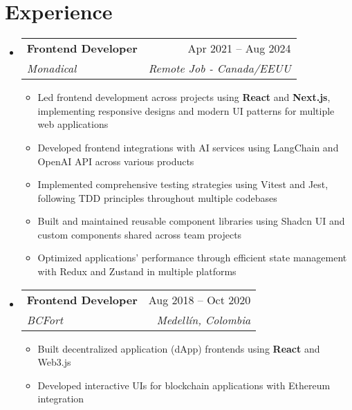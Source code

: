 \documentclass[letterpaper,11pt]{article}
\makeatletter
\newcommand{\resumeSubheading}[4]{
  \vspace{-2pt}
  \item[]
  \begin{tabular*}{\textwidth}{@{\extracolsep{\fill}}l r}
    \textbf{#1} & #2 \\
    \textit{#3} & \textit{#4} \\
  \end{tabular*}
  \vspace{-5pt}
}
\makeatother
\begin{document}
\section{Experience}
\begin{itemize}[leftmargin=0pt, itemindent=0pt, label={}]
\resumeSubheading
{Frontend Developer}{Apr 2021 -- Aug 2024}
{Monadical}{Remote Job - Canada/EEUU}
\begin{itemize}[leftmargin=*]
\item Led frontend development across projects using \textbf{React} and \textbf{Next.js}, implementing responsive designs and modern UI patterns for multiple web applications
\item Developed frontend integrations with AI services using LangChain and OpenAI API across various products
\item Implemented comprehensive testing strategies using Vitest and Jest, following TDD principles throughout multiple codebases
\item Built and maintained reusable component libraries using Shadcn UI and custom components shared across team projects
\item Optimized applications' performance through efficient state management with Redux and Zustand in multiple platforms
\end{itemize}

\resumeSubheading
{Frontend Developer}{Aug 2018 -- Oct 2020}
{BCFort}{Medellín, Colombia}
\begin{itemize}[leftmargin=*]
    \item Built decentralized application (dApp) frontends using \textbf{React} and Web3.js
    \item Developed interactive UIs for blockchain applications with Ethereum integration
\end{itemize}
\end{itemize}
\end{document}
